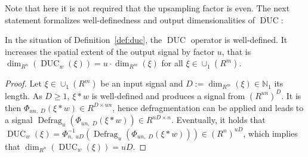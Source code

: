 \documentclass[journal]{IEEEtran}
\newcommand{\N}{\mathbb{N}}
\newcommand{\conv}{\ast}
\DeclareMathOperator{\Defragmentation}{Defrag}
\DeclareMathOperator{\DUC}{DUC}
\begin{document}
Note that here it is not required that the upsampling factor is even.
The next statement formalizes well-definedness and output dimensionalities of $\DUC$:
\begin{lemma}
\label{lem:duc}
In the situation of Definition~\ref{def:duc}, the $\DUC$ operator is well-defined.
It increases the spatial extent of the output signal by factor $u$, that is $\dim_{R^n}(\DUC_w(\xi)) = u\cdot \dim_{R^m}(\xi)$ for all $\xi\in\cup_1(R^m)$.
\end{lemma}\begin{proof}
Let $\xi\in\cup_1(R^m)$ be an input signal and $D := \dim_{R^m}(\xi)\in\N_1$ its length.
As $D \geq 1$, $\xi \conv w$ is well-defined and produces a signal from $(R^{un})^D$.
It is then $\Phi_{un,\; D}( \xi \conv w )\in R^{D\times un}$, hence defragmentation can be applied and leads to a signal $\Defragmentation_u( \Phi_{un,\; D}( \xi \conv w ) )\in R^{uD\times n}$.
Eventually, it holds that $\DUC_w(\xi) = \Phi_{n,\; uD}^{-1}( \Defragmentation_u( \Phi_{un,\; D}( \xi \conv w ) ) )\in (R^n)^{uD}$, which implies that $\dim_{R^n}(\DUC_w(\xi)) = uD$.
\end{proof}
\end{document}
